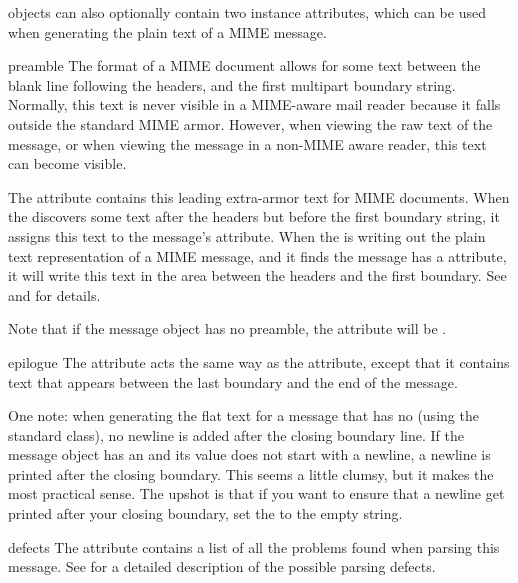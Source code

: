  objects can also optionally contain two instance
attributes, which can be used when generating the plain text of a MIME
message.

\begin{datadesc}{preamble}
The format of a MIME document allows for some text between the blank
line following the headers, and the first multipart boundary string.
Normally, this text is never visible in a MIME-aware mail reader
because it falls outside the standard MIME armor.  However, when
viewing the raw text of the message, or when viewing the message in a
non-MIME aware reader, this text can become visible.

The  attribute contains this leading extra-armor text
for MIME documents.  When the  discovers some text after
the headers but before the first boundary string, it assigns this text
to the message's  attribute.  When the 
is writing out the plain text representation of a MIME message, and it
finds the message has a  attribute, it will write this
text in the area between the headers and the first boundary.  See
 and  for details.

Note that if the message object has no preamble, the
 attribute will be .
\end{datadesc}

\begin{datadesc}{epilogue}
The  attribute acts the same way as the 
attribute, except that it contains text that appears between the last
boundary and the end of the message.

One note: when generating the flat text for a 
message that has no  (using the standard
 class), no newline is added after the closing
boundary line.  If the message object has an  and its
value does not start with a newline, a newline is printed after the
closing boundary.  This seems a little clumsy, but it makes the most
practical sense.  The upshot is that if you want to ensure that a
newline get printed after your closing  boundary,
set the  to the empty string.
\end{datadesc}

\begin{datadesc}{defects}
The  attribute contains a list of all the problems found when
parsing this message.  See  for a detailed description
of the possible parsing defects.

\end{datadesc}

